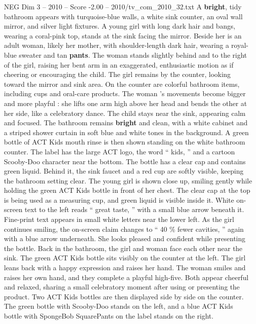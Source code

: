 \begin{textsample}{NEG Dim 3 – 2010 – Score -2.00 – 2010/tv\_com\_2010\_32.txt}  \label{ex:f3_neg_015}
A \textbf{bright}, tidy bathroom appears with turquoise-blue walls, a white sink counter, an oval wall mirror, and silver light fixtures.
A young girl with long dark hair and bangs, wearing a coral-pink top, stands at the sink facing the mirror.
Beside her is an adult woman, likely her mother, with shoulder-length dark hair, wearing a royal-blue sweater and tan \textbf{pants}.
The woman stands slightly behind and to the right of the girl, raising her bent arm in an exaggerated, enthusiastic motion as if cheering or encouraging the child.
The girl remains by the counter, looking toward the mirror and sink area.
On the counter are colorful bathroom items, including cups and oral-care products.
The woman ’s movements become bigger and more playful : she lifts one arm high above her head and bends the other at her side, like a celebratory dance.
The child stays near the sink, appearing calm and focused.
The bathroom remains \textbf{bright} and clean, with a white cabinet and a striped shower curtain in soft blue and white tones in the background.
A green bottle of ACT Kids mouth rinse is then shown standing on the white bathroom counter.
The label has the large ACT logo, the word “ kids, ” and a cartoon Scooby-Doo character near the bottom.
The bottle has a clear cap and contains green liquid.
Behind it, the sink faucet and a red cup are softly visible, keeping the bathroom setting clear.
The young girl is shown close up, smiling gently while holding the green ACT Kids bottle in front of her chest.
The clear cap at the top is being used as a measuring cup, and green liquid is visible inside it.
White on-screen text to the left reads “ great taste, ” with a small blue arrow beneath it.
Fine-print text appears in small white letters near the lower left.
As the girl continues smiling, the on-screen claim changes to “ 40 \% fewer cavities, ” again with a blue arrow underneath.
She looks pleased and confident while presenting the bottle.
Back in the bathroom, the girl and woman face each other near the sink.
The green ACT Kids bottle sits visibly on the counter at the left.
The girl leans back with a happy expression and raises her hand.
The woman smiles and raises her own hand, and they complete a playful high-five.
Both appear cheerful and relaxed, sharing a small celebratory moment after using or presenting the product.
Two ACT Kids bottles are then displayed side by side on the counter.
The green bottle with Scooby-Doo stands on the left, and a blue ACT Kids bottle with SpongeBob SquarePants on the label stands on the right.

\end{textsample}
